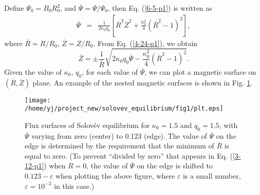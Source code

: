 \documentclass{llncs}
\begin{document}
Define $\Psi_0 = B_0 R_0^2$, and $\overline{\Psi} = \Psi / \Psi_0$, then Eq.
(\ref{6-5-p1}) is written as
\begin{eqnarray}
  \overline{\Psi} & = & \frac{1}{2 \kappa_0 q_0} \left[ \overline{R}^2
  \overline{Z}^2 + \frac{\kappa_0^2}{4} (\overline{R}^2 - 1)^2 \right], 
  \label{4-24-p1}
\end{eqnarray}
where $\overline{R} = R / R_0$, $\overline{Z} = Z / R_0$. From Eq.
(\ref{4-24-p1}), we obtain
\begin{equation}
  \label{3-12-p1} \overline{Z} = \pm \frac{1}{\overline{R}} \sqrt{2 \kappa_0
  q_0 \overline{\Psi} - \frac{\kappa_0^2}{4} (\overline{R}^2 - 1)^2} .
\end{equation}
Given the value of $\kappa_0$, $q_0$, for each value of $\overline{\Psi}$, we
can plot a magnetic surface on $(\overline{R}, \overline{Z})$ plane. An
example of the nested magnetic surfaces is shown in Fig. \ref{4-24-p6}.

\begin{figure}[h]
  \texttt{[image: /home/yj/project\_new/solovev\_equilibrium/fig1/plt.eps]}
  \caption{\label{4-24-p6}Flux surfaces of Solov{\'e}v equilibrium for
  $\kappa_0 = 1.5$ and $q_0 = 1.5$, with $\overline{\Psi}$ varying from zero
  (center) to 0.123 (edge). The value of $\overline{\Psi}$ on the edge is
  determined by the requirement that the minimum of $\overline{R}$ is equal to
  zero. (To prevent ``divided by zero'' that appears in Eq. (\ref{3-12-p1})
  when $R = 0$, the value of $\overline{\Psi}$ on the edge is shifted to
  $0.123 - \varepsilon$ when plotting the above figure, where $\varepsilon$ is
  a small number, $\varepsilon = 10^{- 3}$ in this case.)}
\end{figure}
\end{document}
